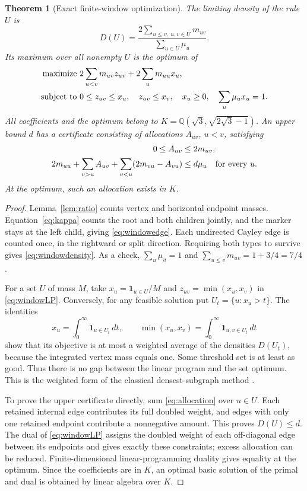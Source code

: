 \documentclass[11pt,a4paper]{article}
\newtheorem{theorem}{Theorem}[section]
\theoremstyle{definition}
\theoremstyle{remark}
\newcommand{\Q}{\mathbb Q}
\newcommand{\ind}{\mathbf1}
\begin{document}
\begin{theorem}[Exact finite-window optimization]\label{thm:window}
The limiting density of the rule $U$ is
\begin{equation}\label{eq:windowdensity}
D(U)=\frac{2\sum_{u\le v,\ u,v\in U}m_{uv}}{\sum_{u\in U}\mu_u}.
\end{equation}
Its maximum over all nonempty $U$ is the optimum of
\begin{align}\label{eq:windowLP}
\text{maximize }&2\sum_{u<v}m_{uv}z_{uv}+2\sum_u m_{uu}x_u,\notag\\
\text{subject to }&0\le z_{uv}\le x_u,\quad z_{uv}\le x_v,\quad
x_u\ge0,\quad\sum_u\mu_u x_u=1.
\end{align}
All coefficients and the optimum belong to $K=\Q(\sqrt3,\sqrt{2\sqrt3-1})$.
An upper bound $d$ has a certificate consisting of allocations $A_{uv}$, $u<v$, satisfying
\begin{align}\label{eq:allocation}
0\le A_{uv}&\le2m_{uv},\notag\\
2m_{uu}+\sum_{v>u}A_{uv}+\sum_{v<u}(2m_{vu}-A_{vu})&\le d\mu_u
\quad\text{for every }u.
\end{align}
At the optimum, such an allocation exists in $K$.
\end{theorem}
\begin{proof}
Lemma~\ref{lem:ratio} counts vertex and horizontal endpoint masses. Equation~\eqref{eq:kappa} counts the root and both children jointly, and the marker stays at the left child, giving \eqref{eq:windowedge}. Each undirected Cayley edge is counted once, in the rightward or split direction. Requiring both types to survive gives \eqref{eq:windowdensity}. As a check, $\sum_u\mu_u=1$ and $\sum_{u\le v}m_{uv}=1+3/4=7/4$.

For a set $U$ of mass $M$, take $x_u=\ind_{u\in U}/M$ and $z_{uv}=\min(x_u,x_v)$ in \eqref{eq:windowLP}. Conversely, for any feasible solution put $U_t=\{u:x_u>t\}$. The identities
\[
x_u=\int_0^\infty\ind_{u\in U_t}\,dt,\qquad
\min(x_u,x_v)=\int_0^\infty\ind_{u,v\in U_t}\,dt
\]
show that its objective is at most a weighted average of the densities $D(U_t)$, because the integrated vertex mass equals one. Some threshold set is at least as good. Thus there is no gap between the linear program and the set optimum. This is the weighted form of the classical densest-subgraph method \cite{Goldberg}.

To prove the upper certificate directly, sum \eqref{eq:allocation} over $u\in U$. Each retained internal edge contributes its full doubled weight, and edges with only one retained endpoint contribute a nonnegative amount. This proves $D(U)\le d$. The dual of \eqref{eq:windowLP} assigns the doubled weight of each off-diagonal edge between its endpoints and gives exactly these constraints; excess allocation can be reduced. Finite-dimensional linear-programming duality gives equality at the optimum. Since the coefficients are in $K$, an optimal basic solution of the primal and dual is obtained by linear algebra over $K$.
\end{proof}
\end{document}
